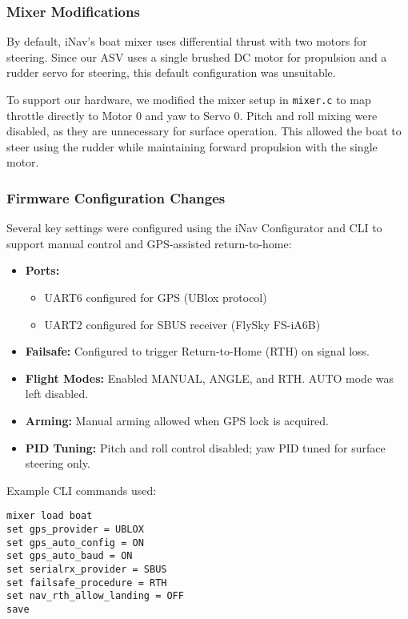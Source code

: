 \subsubsection*{Mixer Modifications}

By default, iNav's boat mixer uses differential thrust with two motors for steering. Since our ASV uses a single brushed DC motor for propulsion and a rudder servo for steering, this default configuration was unsuitable.

To support our hardware, we modified the mixer setup in \texttt{mixer.c} to map throttle directly to Motor 0 and yaw to Servo 0. Pitch and roll mixing were disabled, as they are unnecessary for surface operation. This allowed the boat to steer using the rudder while maintaining forward propulsion with the single motor.

\subsubsection*{Firmware Configuration Changes}

Several key settings were configured using the iNav Configurator and CLI to support manual control and GPS-assisted return-to-home:

\begin{itemize}
    \item \textbf{Ports:}
    \begin{itemize}
        \item UART6 configured for GPS (UBlox protocol)
        \item UART2 configured for SBUS receiver (FlySky FS-iA6B)
    \end{itemize}
    \item \textbf{Failsafe:} Configured to trigger Return-to-Home (RTH) on signal loss.
    \item \textbf{Flight Modes:} Enabled MANUAL, ANGLE, and RTH. AUTO mode was left disabled.
    \item \textbf{Arming:} Manual arming allowed when GPS lock is acquired.
    \item \textbf{PID Tuning:} Pitch and roll control disabled; yaw PID tuned for surface steering only.
\end{itemize}

Example CLI commands used:

\begin{lstlisting}
mixer load boat
set gps_provider = UBLOX
set gps_auto_config = ON
set gps_auto_baud = ON
set serialrx_provider = SBUS
set failsafe_procedure = RTH
set nav_rth_allow_landing = OFF
save
\end{lstlisting}

